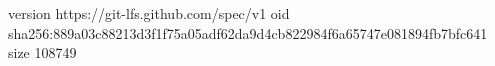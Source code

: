 version https://git-lfs.github.com/spec/v1
oid sha256:889a03c88213d3f1f75a05adf62da9d4cb822984f6a65747e081894fb7bfc641
size 108749
